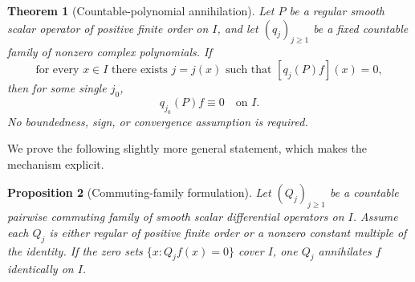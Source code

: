 \documentclass[11pt,reqno]{amsart}
\numberwithin{equation}{section}
\newtheorem{theorem}{Theorem}[section]
\newtheorem{proposition}[theorem]{Proposition}
\theoremstyle{definition}
\theoremstyle{remark}
\begin{document}
\begin{theorem}[Countable-polynomial annihilation]\label{thm:algebraic}
Let $P$ be a regular smooth scalar operator of positive finite order on $I$, and let $(q_j)_{j\ge1}$ be a fixed countable family of nonzero complex polynomials. If
\begin{equation}\label{eq:countable}
 \text{for every }x\in I\text{ there exists }j=j(x)
 \text{ such that }[q_j(P)f](x)=0,
\end{equation}
then for some single $j_0$,
\begin{equation}\label{eq:globalann}
 q_{j_0}(P)f\equiv0\quad\text{on }I.
\end{equation}
No boundedness, sign, or convergence assumption is required.
\end{theorem}

We prove the following slightly more general statement, which makes the mechanism explicit.
\begin{proposition}[Commuting-family formulation]\label{prop:commuting}
Let $(Q_j)_{j\ge1}$ be a countable pairwise commuting family of smooth scalar differential operators on $I$. Assume each $Q_j$ is either regular of positive finite order or a nonzero constant multiple of the identity. If the zero sets $\{x:Q_jf(x)=0\}$ cover $I$, one $Q_j$ annihilates $f$ identically on $I$.
\end{proposition}
\end{document}

